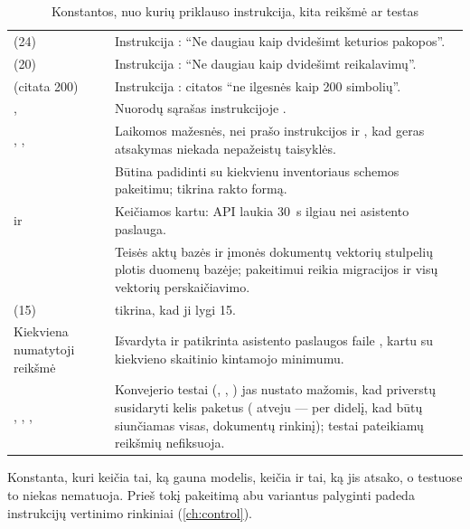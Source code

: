 \begin{table}[H]
\caption{Konstantos, nuo kurių priklauso instrukcija, kita reikšmė ar testas}\label{tab:config:depends}
\begin{tabularx}{\textwidth}{@{}L{50mm}Y@{}}
\toprule
{} &  \\
\midrule
{} (24) & Instrukcija : \enquote{Ne daugiau kaip dvidešimt keturios pakopos}. \\
 (20) & Instrukcija : \enquote{Ne daugiau kaip dvidešimt reikalavimų}. \\
 (citata 200) & Instrukcija : citatos \enquote{ne ilgesnės kaip 200 simbolių}. \\
,  & Nuorodų sąrašas instrukcijoje . \\
, ,  & Laikomos mažesnės, nei prašo instrukcijos  ir , kad geras atsakymas niekada nepažeistų taisyklės. \\
 & Būtina padidinti su kiekvienu inventoriaus schemos pakeitimu;  tikrina rakto formą. \\
 ir  & Keičiamos kartu: API laukia 30~s ilgiau nei asistento paslauga. \\
 & Teisės aktų bazės ir įmonės dokumentų vektorių stulpelių plotis duomenų bazėje; pakeitimui reikia migracijos ir visų vektorių perskaičiavimo. \\
 (15) &  tikrina, kad ji lygi 15. \\
Kiekviena  numatytoji reikšmė & Išvardyta ir patikrinta asistento paslaugos faile , kartu su kiekvieno skaitinio kintamojo minimumu. \\
, , ,  & Konvejerio testai (, , ) jas nustato mažomis, kad priverstų susidaryti kelis paketus ( atveju --- per didelį, kad būtų siunčiamas visas, dokumentų rinkinį); testai pateikiamų reikšmių nefiksuoja. \\
\bottomrule
\end{tabularx}
\end{table}

Konstanta, kuri keičia tai, ką gauna modelis, keičia ir tai, ką jis atsako, o testuose to niekas
nematuoja. Prieš tokį pakeitimą abu variantus palyginti padeda instrukcijų vertinimo rinkiniai
(\cref{ch:control}).
